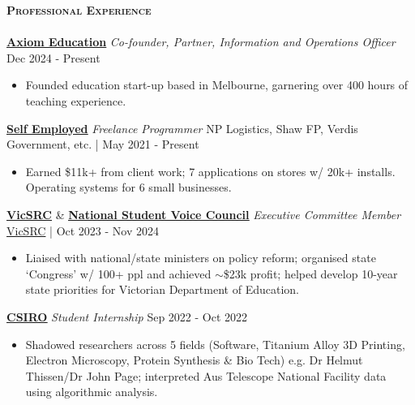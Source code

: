 \documentclass[a4paper]{article}
\newcommand{\lineunder} {
    \vspace*{-8pt} \\
    \hspace*{-10pt} \hrulefill \\
}
\newcommand{\header} [1] {
    {\hspace*{-10pt}\vspace*{6pt} \large\textsc{\textbf{#1}}}
    \vspace*{-6pt} \lineunder
}
\begin{document}
\vspace*{1mm}
\header{Professional Experience}

\textbf{\href{https://axiomeducation.com.au/}{\ul{Axiom Education}}} \textit{Co-founder, Partner, Information and Operations Officer} \hfill Dec 2024 - Present\\
\vspace{-3.5mm}
\begin{itemize} \itemsep 0.5pt
\item Founded education start-up based in Melbourne, garnering over 400 hours of teaching experience.
\end{itemize}
\vspace{-2.5mm}

\textbf{\href{https://garv-shah.github.io/portfolio/}{\ul{Self Employed}}} \textit{Freelance Programmer} \hfill NP Logistics, Shaw FP, Verdis Government, etc. | May 2021 - Present\\
\vspace{-3.5mm}
\begin{itemize} \itemsep 0.5pt
\item Earned \$11k+ from client work; 7 applications on stores w/ 20k+ installs. Operating systems for 6 small businesses.
\end{itemize}
\vspace{-2.5mm}

\textbf{\href{https://vicsrc.org.au/about/executive-committee}{\ul{VicSRC}}} \& \textbf{\href{https://garv-shah.github.io/nsvc.pdf}{\ul{National Student Voice Council}}} \textit{Executive Committee Member} \hfill \href{https://vicsrc.org.au/}{VicSRC} | Oct 2023 - Nov 2024\\
\vspace{-3.5mm}
\begin{itemize} \itemsep 0.5pt
\item Liaised with national/state ministers on policy reform; organised state ‘Congress’ w/ 100+ ppl and achieved $\sim$\$23k profit; helped develop 10-year state priorities for Victorian Department of Education.
\end{itemize}
\vspace{-2.5mm}

\textbf{\href{https://www.csiro.au/en/}{\ul{CSIRO}}} \textit{Student Internship} \hfill Sep 2022 - Oct 2022\\
\vspace{-3.5mm}
\begin{itemize} \itemsep 0.5pt
\item Shadowed researchers across 5 fields (Software, Titanium Alloy 3D Printing, Electron Microscopy, Protein Synthesis \& Bio Tech) e.g. Dr Helmut Thissen/Dr John Page; interpreted Aus Telescope National Facility data using algorithmic analysis.
\end{itemize}
\vspace{-2.5mm}
\end{document}
